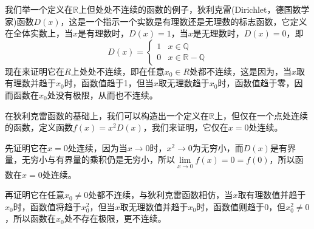 \begin{example}
  我们举一个定义在$\mathbb{R}$上但处处不连续的函数的例子，狄利克雷(Dirichlet，德国数学家)函数$D(x)$，这是一个指示一个实数是有理数还是无理数的标志函数，它定义在全体实数上，当$x$是有理数时，$D(x)=1$，当$x$是无理数时，$D(x)=0$，即
  \[
    D(x) =
    \begin{cases}
      1 & x \in \mathbb{Q} \\
      0 & x \in \mathbb{R}-\mathbb{Q}
    \end{cases}
  \]
  现在来证明它在$R$上处处不连续，即在任意$x_0 \in R$处都不连续，这是因为，当$x$取有理数并趋于$x_0$时，函数值趋于1，但当$x$取无理数趋于$x_0$时，函数值趋于零，因而函数在$x_0$处没有极限，从而也不连续。
\end{example}

\begin{example}
  在狄利克雷函数的基础上，我们可以构造出一个定义在$\mathbb{R}$上，但仅在一个点处连续的函数，定义函数$f(x)=x^2D(x)$，我们来证明，它仅在$x=0$处连续。

  先证明它在$x=0$处连续，因为当$x \to 0$时，$x^2 \to 0$为无穷小，而$D(x)$是有界量，无穷小与有界量的乘积仍是无穷小，所以$\lim\limits_{x \to 0} f(x)=0=f(0)$，所以函数在$x=0$处连续。

  再证明它在任意$x_0 \neq 0$处都不连续，与狄利克雷函数相仿，当$x$取有理数值并趋于$x_0$时，函数值将趋于$x_0^2$，但当$x$取无理数值并趋于$x_0$时，函数值则趋于$0$，但$x_0^2 \neq 0$，所以函数在$x_0$处不存在极限，更不连续。
\end{example}

